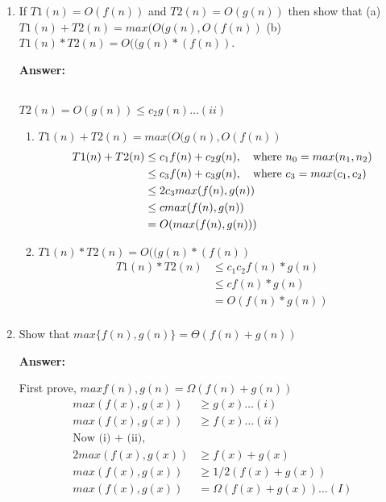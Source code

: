 \documentclass[a4paper]{article}
\begin{document}
\begin{enumerate}[label=(\alph*)]
\begin{enumerate}[label=(\roman*)]
     \end{enumerate}
     
     \item If {$ T1(n) = O(f(n)) $} and {$ T2(n) = O(g(n)) $} then show that (a) {$ T1(n) + T2(n) = max(O(g(n), O(f(n)) $} (b) {$ T1(n) * T2(n) = O((g(n) * (f(n)) $}.
 
     \textbf{Answer:}
     
     \\{$ T2(n) = O(g(n)) \le c_2g(n) \ldots (ii) $}
     
     \begin{enumerate}
         \item {$ T1(n) + T2(n) = max(O(g(n), O(f(n)) $}
         \begin{align*}
             T1(n) + T2(n) &\le c_1f(n) + c_2g(n) , \quad \text{where {$ n_0 = max(n_1, n_2) $}} \\
             &\le c_3f(n) + c_3g(n) , \quad \text{where {$c_3 = max(c_1, c_2)$}} \\
             &\le 2c_3 max(f(n), g(n))  \\
             &\le c max(f(n), g(n))  \\
             &= O (max(f(n), g(n)))  \\
         \end{align*}
         
         \item {$ T1(n) * T2(n) = O((g(n) * (f(n)) $}
         \begin{align*}
             T1(n) * T2(n) &\le c_1c_2f(n)*g(n) \\
             &\le cf(n)*g(n) \\
             &= O(f(n)*g(n)) \\
         \end{align*}
         
     \end{enumerate}
     
     \vspace{0.5cm}
     \item  Show that {$ max\{f(n), g(n)\} = \Theta(f(n) + g(n)) $}
 
     \textbf{Answer:}
     
     \*First prove, {$ max{f(n), g(n)} = \Omega(f(n) + g(n)) $}
     \begin{align*}
         max(f(x), g(x)) &\ge g(x) \dots (i)  \\
         max(f(x), g(x)) &\ge f(x) \dots (ii)  \\
         \text{Now (i) + (ii),} \\
         2max(f(x), g(x)) &\ge f(x) + g(x)  \\
         max(f(x), g(x)) &\ge 1/2 (f(x) + g(x))  \\
         max(f(x), g(x)) &= \Omega(f(x) + g(x)) \dots (I)  \\
     \end{align*}
     

\end{enumerate}
\end{document}
